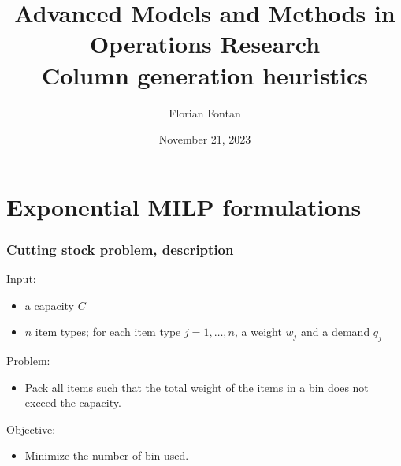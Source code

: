 \documentclass[10pt]{beamer}
\author{Florian Fontan}
\title{Advanced Models and Methods in Operations Research \\ Column generation heuristics}
\date{November 21, 2023}
\begin{document}
\newcommand{\customcite}[1]{\citetitle{#1}, \citeauthor{#1}, \citeyear{#1}}


\maketitle

\section{Exponential MILP formulations}

\begin{frame}
  \frametitle{Cutting stock problem, description}

  Input:
  \begin{itemize}
    \item a capacity \alert{$C$}
    \item $n$ item types; for each item type $j = 1, \dots, n$, a weight \alert{$w_j$} and a demand \alert{$q_j$}
  \end{itemize}

  Problem:
  \begin{itemize}
    \item Pack all items such that the total weight of the items in a bin does not exceed the capacity.
  \end{itemize}

  Objective:
  \begin{itemize}
    \item Minimize the number of bin used.
  \end{itemize}
\end{frame}
\end{document}

